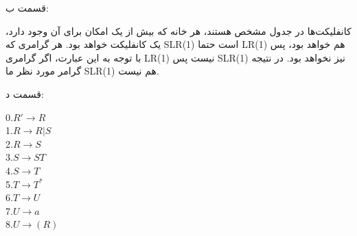 قسمت ب:

کانفلیکت‌ها در جدول مشخص هستند، هر خانه که بیش از یک امکان برای آن وجود دارد، یک کانفلیکت خواهد بود.
هر گرامری که SLR(1) است حتما LR(1) هم خواهد بود، پس با توجه به این عبارت، اگر گرامری LR(1) نیست پس SLR(1) نیز نخواهد بود.
در نتیجه گرامر مورد نظر ما SLR(1) هم نیست.

قسمت د:

\begin{center}
    \begin{latin}
    0.$R' \rightarrow R$
    \\
    1.$R \rightarrow R|S$
    \\
    2.$R \rightarrow S$
    \\
    3.$S \rightarrow ST$
    \\
    4.$S \rightarrow T$
    \\
    5.$T \rightarrow {T}^{*}$
    \\
    6.$T \rightarrow U$
    \\
    7.$U \rightarrow a$
    \\
    8.$U \rightarrow (R)$
    \\
    \end{latin}
\end{center}